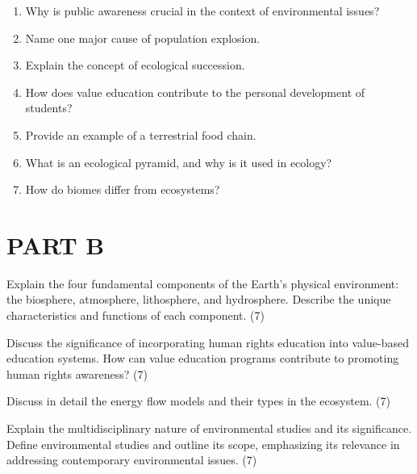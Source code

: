 \documentclass[12pt,a4paper]{article}
\begin{document}
\begin{questions}
    \item \begin{enumerate}[label=(\alph*), leftmargin=2em]
        \item Why is public awareness crucial in the context of environmental issues?
        \item Name one major cause of population explosion.
        \item Explain the concept of ecological succession.
        \item How does value education contribute to the personal development of students?
        \item  Provide an example of a terrestrial food chain.
        \item What is an ecological pyramid, and why is it used in ecology?
        \item How do biomes differ from ecosystems?
    \end{enumerate}

\vspace{1em}

\section*{\textbf{PART B}}

    \item Explain the four fundamental components of the Earth's physical environment: the biosphere, atmosphere, lithosphere, and hydrosphere. Describe the unique characteristics and functions of each component. \hfill (7)

    \vspace{\baselineskip}
    
    \item Discuss the significance of incorporating human rights education into value-based education systems. How can value education programs contribute to promoting human rights awareness? \hfill (7)

    \vspace{\baselineskip}
    
    \item  Discuss in detail the energy flow models and their types in the ecosystem. (7)

    \vspace{\baselineskip}
    
    \item Explain the multidisciplinary nature of environmental studies and its significance. Define environmental studies and outline its scope, emphasizing its relevance in addressing contemporary environmental issues. (7)


\end{questions}
\end{document}
